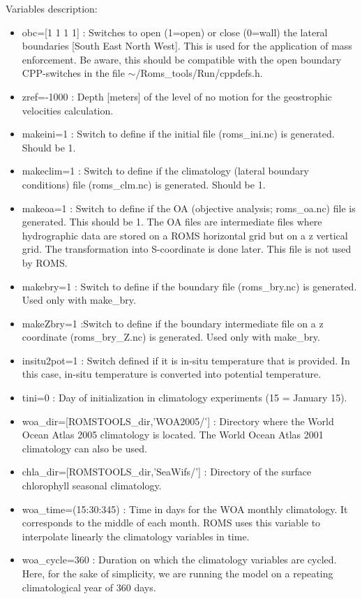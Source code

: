 Variables description:
\begin{itemize}
\item obc=[1 1 1 1] : Switches to open (1=open) or close (0=wall) the lateral
boundaries [South East North West]. This is used for the application of mass
enforcement. Be aware, this should be compatible with the open boundary
CPP-switches in the file $\sim$/Roms\_tools/Run/cppdefs.h.
\item zref=-1000 : Depth [meters] of the level of no motion for the geostrophic 
velocities calculation.
\item makeini=1 : Switch to define if the initial file (roms\_ini.nc) is generated. 
Should be 1.
\item makeclim=1 : Switch to define if the climatology
 (lateral boundary conditions) file (roms\_clm.nc) is generated. Should be 1.
\item makeoa=1 : Switch to define if the OA (objective analysis; roms\_oa.nc)
 file is generated. This should be 1. The OA files are intermediate files
 where hydrographic data are stored on a ROMS horizontal grid but on
 a z vertical grid. The transformation into S-coordinate is done later.
 This file is not used by ROMS.
\item makebry=1 : Switch to define if the boundary file (roms\_bry.nc) is generated.
Used only with make\_bry.
\item makeZbry=1  :Switch to define if the boundary intermediate file on a z coordinate 
 (roms\_bry\_Z.nc) is generated. Used only with make\_bry.
\item insitu2pot=1 : Switch defined if it is in-situ temperature that is provided.
In this case, in-situ temperature is converted into potential temperature.
\item tini=0 : Day of initialization in climatology experiments (15 = January 15).
\item woa\_dir=[ROMSTOOLS\_dir,'WOA2005/'] : Directory where the World Ocean
Atlas 2005 climatology \citep{Con02} is located. The World Ocean
Atlas 2001 climatology can also be used.
\item chla\_dir=[ROMSTOOLS\_dir,'SeaWifs/'] : Directory of the surface 
chlorophyll seasonal climatology.
\item woa\_time=(15:30:345) : Time in days for the WOA monthly climatology. 
It corresponds to the middle of each month. ROMS uses this variable to 
interpolate linearly the climatology variables in time.
\item woa\_cycle=360 : Duration on which the climatology variables are cycled. 
Here, for the sake of simplicity, we are running the model on a repeating climatological 
year of 360 days.
\end{itemize}
